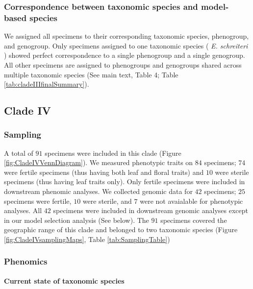 \documentclass[
  11pt,
]{article}
\begin{document}
\hypertarget{correspondence-between-taxonomic-species-and-model-based-species-2}{%
\subsubsection{Correspondence between taxonomic species and model-based species}\label{correspondence-between-taxonomic-species-and-model-based-species-2}}

We assigned all specimens to their corresponding taxonomic species, phenogroup, and genogroup. Only specimens assigned to one taxonomic species ( \emph{E. schreiteri} ) showed perfect correspondence to a single phenogroup and a single genogroup. All other specimens are assigned to phenogroups and genogroups shared across multiple taxonomic species (See main text, Table 4; Table \ref{tab:cladeIIIfinalSummary}).

\hypertarget{clade-iv}{%
\subsection{Clade IV}\label{clade-iv}}

\hypertarget{sampling-4}{%
\subsubsection{Sampling}\label{sampling-4}}

A total of \(91\) specimens were included in this clade (Figure \ref{fig:CladeIVVennDiagram}). We measured phenotypic traits on \(84\) specimens; \(74\) were fertile specimens (thus having both leaf and floral traits) and \(10\) were sterile specimens (thus having leaf traits only). Only fertile specimens were included in downstream phenomic analyses. We collected genomic data for \(42\) specimens; \(25\) specimens were fertile, \(10\) were sterile, and \(7\) were not avaialable for phenotypic analyses. All \(42\) specimens were included in downstream genomic analyses except in our model selection analysis (See below). The \(91\) specimens covered the geographic range of this clade and belonged to two taxonomic species (Figure \ref{fig:CladeIVsamplingMaps}, Table \ref{tab:SamplingTable})

\hypertarget{phenomics-4}{%
\subsubsection{Phenomics}\label{phenomics-4}}

\hypertarget{current-state-of-taxonomic-species-3}{%
\paragraph{Current state of taxonomic species}\label{current-state-of-taxonomic-species-3}}
\end{document}

